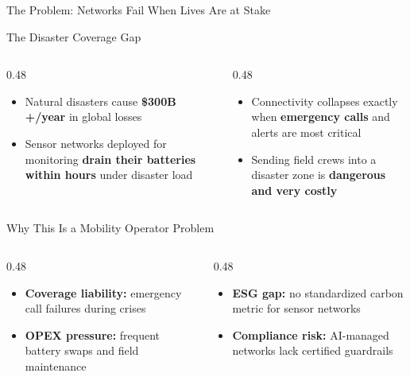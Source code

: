 \documentclass[aspectratio=169,t,10pt]{beamer}
\begin{document}
\begin{frame}[shrink=5]{The Problem: Networks Fail When Lives Are at Stake}
\begin{block}{\faExclamationTriangle\; The Disaster Coverage Gap}
  \begin{columns}[T]
  \begin{column}{0.48\textwidth}
    \begin{itemize}\small\setlength{\itemsep}{5pt}
      \item Natural disasters cause \textbf{\$300B\,+/year} in global losses
      \item Sensor networks deployed for monitoring
            \textbf{drain their batteries within hours} under disaster load
    \end{itemize}
  \end{column}
  \begin{column}{0.48\textwidth}
    \begin{itemize}\small\setlength{\itemsep}{5pt}
      \item Connectivity collapses exactly when \textbf{emergency calls}
            and alerts are most critical
      \item Sending field crews into a disaster zone
            is \textbf{dangerous and very costly}
    \end{itemize}
  \end{column}
  \end{columns}
\end{block}
\vspace{6pt}
\begin{alertblock}{\faBriefcase\; Why This Is a Mobility Operator Problem}
  \begin{columns}[T]
  \begin{column}{0.48\textwidth}
    \begin{itemize}\small\setlength{\itemsep}{4pt}
      \item \textbf{Coverage liability:} emergency call failures during crises
      \item \textbf{OPEX pressure:} frequent battery swaps and field maintenance
    \end{itemize}
  \end{column}
  \begin{column}{0.48\textwidth}
    \begin{itemize}\small\setlength{\itemsep}{4pt}
      \item \textbf{ESG gap:} no standardized carbon metric for sensor networks
      \item \textbf{Compliance risk:} AI-managed networks lack certified guardrails

\end{itemize}
\end{column}
\end{columns}
\end{alertblock}
\end{frame}
\end{document}
